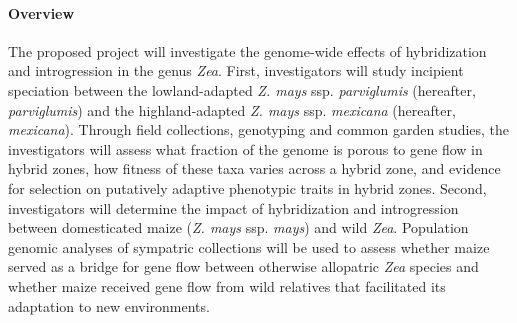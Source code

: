 
%
%
%
%
%
%

\paragraph{Overview} The proposed project will investigate the genome-wide effects of hybridization and introgression in the genus \emph{Zea}.  First, investigators will study  incipient speciation between the lowland-adapted \emph{Z. mays} ssp. \emph{parviglumis} (hereafter, \emph{parviglumis}) and the highland-adapted \emph{Z. mays} ssp. \emph{mexicana} (hereafter, \emph{mexicana}).  Through field collections, genotyping and common garden studies, the investigators will assess what fraction of the genome is porous to gene flow in hybrid zones, how fitness of these taxa varies across a hybrid zone, and evidence for selection on putatively adaptive phenotypic traits in hybrid zones. Second, investigators will determine the impact of hybridization and introgression between domesticated maize (\emph{Z. mays} ssp. \emph{mays}) and wild  \emph{Zea}. Population genomic analyses of sympatric collections will be used to assess whether maize served as a bridge for gene flow between otherwise allopatric \emph{Zea} species and whether maize received gene flow from wild relatives that facilitated its adaptation to new environments.


